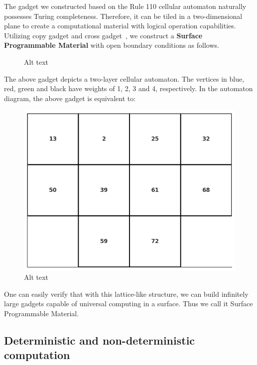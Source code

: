 \documentclass[twocolumn,superscriptaddress,english,showpacs,longbibliography]{revtex4-2}
\begin{document}
The gadget we constructed based on the Rule 110 cellular automaton
naturally possesses Turing completeness. Therefore, it can be tiled in a
two-dimensional plane to create a computational material with logical
operation capabilities. Utilizing copy gadget and cross
gadget~\cite{Nguyen2023}, we construct a
\textbf{Surface Programmable Material} with open boundary conditions as
follows.

\begin{figure}
\centering
%
\caption{Alt text}
\end{figure}

The above gadget depicts a two-layer cellular automaton. The vertices in
blue, red, green and black have weights of 1, 2, 3 and 4, respectively.
In the automaton diagram, the above gadget is equivalent to:

\begin{figure}
\centering
\includegraphics[width=\columnwidth]{../notes/images/rule110_2-2_automaton.png}
\caption{Alt text}
\end{figure}

One can easily verify that with this lattice-like structure, we can
build infinitely large gadgets capable of universal computing in a
surface. Thus we call it Surface Programmable Material.

\subsection{Deterministic and non-deterministic
computation}\label{deterministic-and-non-deterministic-computation}
\end{document}
